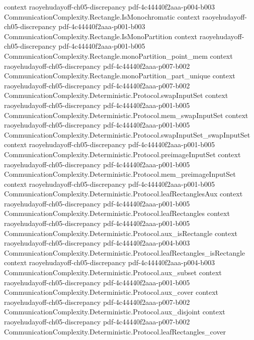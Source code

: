 \begin{theorem}
  {context}
  {raoyehudayoff-ch05-discrepancy}
  {pdf-4c44440f2aaa-p004-b003}
\proofstep
  {CommunicationComplexity.Rectangle.IsMonochromatic}
  {context}
  {raoyehudayoff-ch05-discrepancy}
  {pdf-4c44440f2aaa-p001-b003}
\proofstep
  {CommunicationComplexity.Rectangle.IsMonoPartition}
  {context}
  {raoyehudayoff-ch05-discrepancy}
  {pdf-4c44440f2aaa-p001-b005}
\proofstep
  {CommunicationComplexity.Rectangle.monoPartition_point_mem}
  {context}
  {raoyehudayoff-ch05-discrepancy}
  {pdf-4c44440f2aaa-p007-b002}
\proofstep
  {CommunicationComplexity.Rectangle.monoPartition_part_unique}
  {context}
  {raoyehudayoff-ch05-discrepancy}
  {pdf-4c44440f2aaa-p007-b002}
\proofstep
  {CommunicationComplexity.Deterministic.Protocol.swapInputSet}
  {context}
  {raoyehudayoff-ch05-discrepancy}
  {pdf-4c44440f2aaa-p001-b005}
\proofstep
  {CommunicationComplexity.Deterministic.Protocol.mem_swapInputSet}
  {context}
  {raoyehudayoff-ch05-discrepancy}
  {pdf-4c44440f2aaa-p001-b005}
\proofstep
  {CommunicationComplexity.Deterministic.Protocol.swapInputSet_swapInputSet}
  {context}
  {raoyehudayoff-ch05-discrepancy}
  {pdf-4c44440f2aaa-p001-b005}
\proofstep
  {CommunicationComplexity.Deterministic.Protocol.preimageInputSet}
  {context}
  {raoyehudayoff-ch05-discrepancy}
  {pdf-4c44440f2aaa-p001-b005}
\proofstep
  {CommunicationComplexity.Deterministic.Protocol.mem_preimageInputSet}
  {context}
  {raoyehudayoff-ch05-discrepancy}
  {pdf-4c44440f2aaa-p001-b005}
\proofstep
  {CommunicationComplexity.Deterministic.Protocol.leafRectanglesAux}
  {context}
  {raoyehudayoff-ch05-discrepancy}
  {pdf-4c44440f2aaa-p001-b005}
\proofstep
  {CommunicationComplexity.Deterministic.Protocol.leafRectangles}
  {context}
  {raoyehudayoff-ch05-discrepancy}
  {pdf-4c44440f2aaa-p001-b005}
\proofstep
  {CommunicationComplexity.Deterministic.Protocol.aux_isRectangle}
  {context}
  {raoyehudayoff-ch05-discrepancy}
  {pdf-4c44440f2aaa-p004-b003}
\proofstep
  {CommunicationComplexity.Deterministic.Protocol.leafRectangles_isRectangle}
  {context}
  {raoyehudayoff-ch05-discrepancy}
  {pdf-4c44440f2aaa-p004-b003}
\proofstep
  {CommunicationComplexity.Deterministic.Protocol.aux_subset}
  {context}
  {raoyehudayoff-ch05-discrepancy}
  {pdf-4c44440f2aaa-p001-b005}
\proofstep
  {CommunicationComplexity.Deterministic.Protocol.aux_cover}
  {context}
  {raoyehudayoff-ch05-discrepancy}
  {pdf-4c44440f2aaa-p007-b002}
\proofstep
  {CommunicationComplexity.Deterministic.Protocol.aux_disjoint}
  {context}
  {raoyehudayoff-ch05-discrepancy}
  {pdf-4c44440f2aaa-p007-b002}
\proofstep
  {CommunicationComplexity.Deterministic.Protocol.leafRectangles_cover}

\end{theorem}
